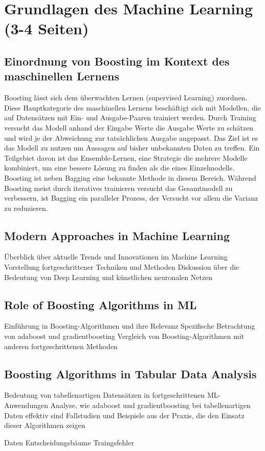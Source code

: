 \section{Grundlagen des Machine Learning (3-4 Seiten)}
\subsection{Einordnung von Boosting im Kontext des maschinellen Lernens}
Boosting lässt sich dem überwachten Lernen (supervised Learning) zuordnen. Diese Hauptkategorie des maschinellen Lernens beschäftigt sich mit Modellen, die auf Datensätzen mit Ein- und Ausgabe-Paaren trainiert werden. Durch Training versucht das Modell anhand der Eingabe Werte die Ausgabe Werte zu schätzen und wird je der Abweichung zur tatsächlichen Ausgabe angepasst. Das Ziel ist es das Modell zu nutzen um Aussagen auf bisher unbekannten Daten zu treffen.
\newline
Ein Teilgebiet davon ist das Ensemble-Lernen, eine Strategie die mehrere Modelle kombiniert, um eine bessere Lösung zu finden als die eines Einzelmodells. Boosting ist neben Bagging eine bekannte Methode in diesem Bereich. Während Boosting meist durch iteratives trainieren versucht das Gesamtmodell zu verbessern, ist Bagging ein paralleler Prozess, der Versucht vor allem die Varianz zu reduzieren.


\subsection{Modern Approaches in Machine Learning}
Überblick über aktuelle Trends und Innovationen im Machine Learning
Vorstellung fortgeschrittener Techniken und Methoden
Diskussion über die Bedeutung von Deep Learning und künstlichen neuronalen Netzen
\subsection{Role of Boosting Algorithms in ML}
Einführung in Boosting-Algorithmen und ihre Relevanz
Spezifische Betrachtung von \gls{adaboost} und \gls{gradientboosting}
Vergleich von Boosting-Algorithmen mit anderen fortgeschrittenen Methoden
\subsection{Boosting Algorithms in Tabular Data Analysis}
Bedeutung von tabellenartigen Datensätzen in fortgeschrittenen ML-Anwendungen
Analyse, wie \gls{adaboost} und \gls{gradientboosting} bei tabellenartigen Daten effektiv sind
Fallstudien und Beispiele aus der Praxis, die den Einsatz dieser Algorithmen zeigen

Daten
Entscheidungsbäume
Traingsfehler
